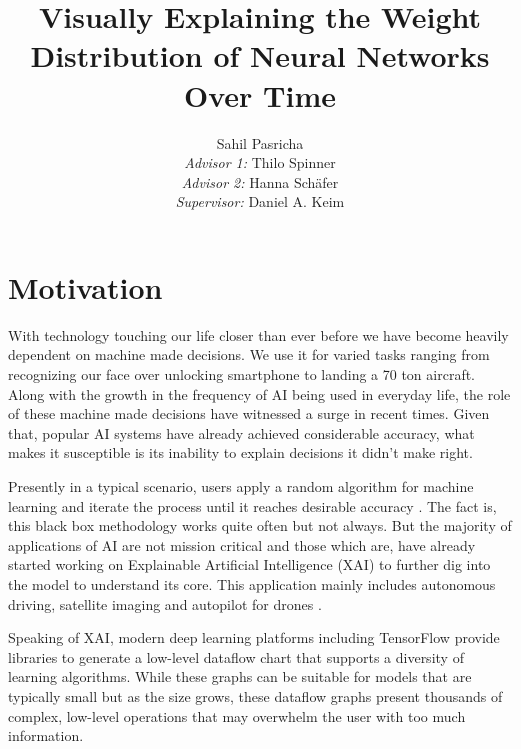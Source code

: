 \documentclass[journal]{vgtc}                %
\title{Visually Explaining the Weight Distribution of Neural Networks Over Time}
\author{Sahil Pasricha\\\textit{Advisor 1:} Thilo Spinner\\\textit{Advisor 2:} Hanna Sch{\"a}fer\\\textit{Supervisor:} Daniel A. Keim}
\begin{document}



\maketitle


\section{Motivation} %
With technology touching our life closer than ever before we have become heavily dependent on machine made decisions.
We use it for varied tasks ranging from recognizing our face over unlocking smartphone to landing a 70 ton aircraft. Along with the growth in the frequency of AI being used in everyday life, the role of these machine made decisions have witnessed a surge in recent times. Given that, popular AI systems have already achieved considerable accuracy, what makes it susceptible is its inability to explain decisions it didn't make right.

Presently in a typical scenario, users apply a random algorithm for machine learning and iterate the process until it reaches desirable accuracy \cite{blackbox}. The fact is, this black box methodology works quite often but not always. But the majority of applications of AI are not mission critical and those which are, have already started working on Explainable Artificial Intelligence (XAI) to further dig into the model to understand its core. This application mainly includes autonomous driving, satellite imaging and autopilot for drones \cite{darpa}.

Speaking of XAI, 
modern deep learning platforms including 
TensorFlow \cite{tensorflow} provide libraries to generate a low-level dataflow chart that supports a diversity of learning algorithms.
While these graphs can be suitable for
models that are typically small  but as the
size grows, these dataflow graphs present
thousands of complex, low-level operations
that may overwhelm the user with too much information.
\end{document}
